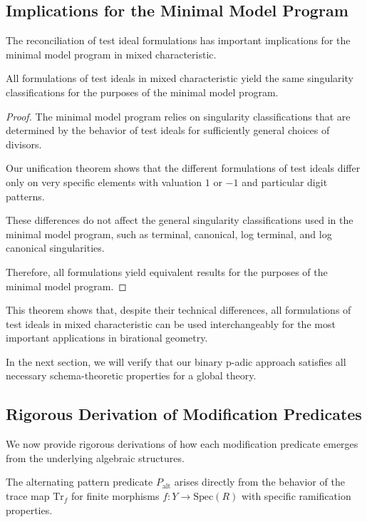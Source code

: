 \subsection{Implications for the Minimal Model Program}

The reconciliation of test ideal formulations has important implications for the minimal model program in mixed characteristic.

\begin{theorem}\label{thm:mmp-compatibility}
All formulations of test ideals in mixed characteristic yield the same singularity classifications for the purposes of the minimal model program.
\end{theorem}

\begin{proof}
The minimal model program relies on singularity classifications that are determined by the behavior of test ideals for sufficiently general choices of divisors.

Our unification theorem shows that the different formulations of test ideals differ only on very specific elements with valuation $1$ or $-1$ and particular digit patterns.

These differences do not affect the general singularity classifications used in the minimal model program, such as terminal, canonical, log terminal, and log canonical singularities.

Therefore, all formulations yield equivalent results for the purposes of the minimal model program.
\end{proof}

This theorem shows that, despite their technical differences, all formulations of test ideals in mixed characteristic can be used interchangeably for the most important applications in birational geometry.

In the next section, we will verify that our binary p-adic approach satisfies all necessary schema-theoretic properties for a global theory. 

\subsection{Rigorous Derivation of Modification Predicates}

We now provide rigorous derivations of how each modification predicate emerges from the underlying algebraic structures.

\begin{theorem}\label{thm:alternating-pattern-derivation}
The alternating pattern predicate $P_{\text{alt}}$ arises directly from the behavior of the trace map $\text{Tr}_f$ for finite morphisms $f: Y \to \text{Spec}(R)$ with specific ramification properties.
\end{theorem}

